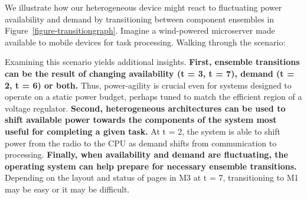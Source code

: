 We illustrate how our heterogeneous device might react to fluctuating power
availability and demand by transitioning between component ensembles in
Figure~\ref{figure-transitiongraph}. Imagine a wind-powered microserver made
available to mobile devices for task processing. Walking through the
scenario:



Examining this scenario yields additional insights. \textbf{First, ensemble
transitions can be the result of changing availability (t = 3, t = 7), demand
(t = 2, t = 6) or both.} Thus, power-agility is crucial even for systems
designed to operate on a static power budget, perhaps tuned to match the
efficient region of a voltage regulator. \textbf{Second, heterogeneous
architectures can be used to shift available power towards the components of
the system most useful for completing a given task.} At t = 2, the system is
able to shift power from the radio to the CPU as demand shifts from
communication to processing. \textbf{Finally, when availability and demand
are fluctuating, the operating system can help prepare for necessary ensemble
transitions.} Depending on the layout and status of pages in M3 at t = 7,
transitioning to M1 may be easy or it may be difficult.
